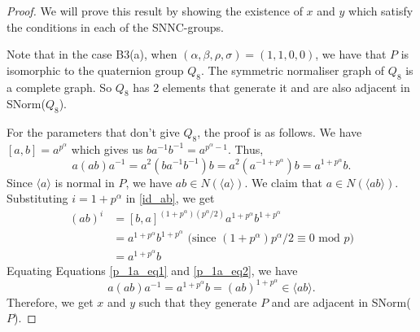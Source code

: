 \documentclass[10pt,a4paper]{amsart}
\begin{document}
\begin{proof}
We will prove this result by showing the existence of $x$ and $y$ which satisfy the conditions in each of the SNNC-groups.
    
 Note that in the case B3(a), when $(\alpha, \beta, \rho, \sigma) = (1, 1, 0, 0)$, we have that $P$ is isomorphic to the quaternion group $Q_8$. The symmetric normaliser graph of $Q_8$ is a complete graph. So $Q_8$ has 2 elements that generate it and are also adjacent in SNorm($Q_8$).
    
For the parameters that don't give $Q_8$, the proof is as follows. We have $ [a,b] = a^{p^\alpha}$ which gives us $ba^{-1}b^{-1}=a^{p^{\alpha}-1}$. Thus, 
    \begin{equation}\label{p_1a_eq1}
      a(ab)a^{-1} = a^2(ba^{-1}b^{-1})b = a^2(a^{-1+p^{\alpha}})b=a^{1+p^{\alpha}}b.
    \end{equation}
Since $\langle a \rangle$ is normal in $P$, we have $ab \in N(\langle a \rangle)$. We claim that $a \in N(\langle ab \rangle)$. Substituting $i=1+p^{\alpha}$ in \ref{id_ab}, we get
    \begin{equation}\label{p_1a_eq2}
        \begin{split}
            (ab)^i &= [b,a]^{(1+p^{\alpha})(p^{\alpha}/2)}a^{1+p^{\alpha}}b^{1+p^{\alpha}}\\
            &= a^{1+p^{\alpha}}b^{1+p^{\alpha}} \text{ (since } (1+p^{\alpha})p^{\alpha}/2 \equiv 0  \text{ mod } p \text{)}\\ 
            &= a^{1+p^{\alpha}}b
        \end{split}
    \end{equation}
    Equating Equations \ref{p_1a_eq1} and \ref{p_1a_eq2}, we have $$a(ab)a^{-1} = a^{1+p^{\alpha}}b = (ab)^{1+p^{\alpha}} \in \langle ab \rangle.$$Therefore, we get $x$ and $y$ such that they generate $P$ and are adjacent in SNorm($P$).
\end{proof}
\end{document}
